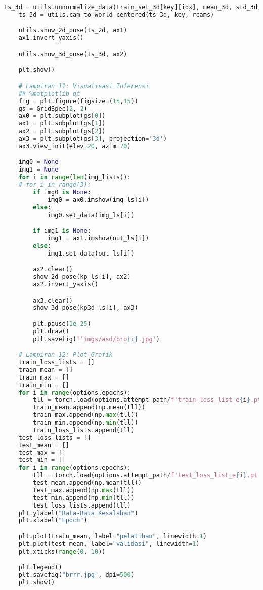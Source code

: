 \begin{lstlisting}[language=Python,multicols=2,basicstyle=\scriptsize\mdseries,breaklines=true]
    ts_3d = utils.unnormalize_data(train_set_3d[key][idx], mean_3d, std_3d, dim_ignore_3d)[0]
    ts_3d = utils.cam_to_world_centered(ts_3d, key, rcams)

    utils.show_2d_pose(ts_2d, ax1)
    ax1.invert_yaxis()

    utils.show_3d_pose(ts_3d, ax2)

    plt.show()

    # Lampiran 11: Visualisasi Inferensi
    ## %matplotlib qt
    fig = plt.figure(figsize=(15,15))
    gs = GridSpec(2, 2)
    ax0 = plt.subplot(gs[0])
    ax1 = plt.subplot(gs[1])
    ax2 = plt.subplot(gs[2])
    ax3 = plt.subplot(gs[3], projection='3d')
    ax3.view_init(elev=20, azim=70)

    img0 = None
    img1 = None
    for i in range(len(img_lists)):
    # for i in range(3):
        if img0 is None:
            img0 = ax0.imshow(img_ls[i])
        else:
            img0.set_data(img_ls[i])

        if img1 is None:
            img1 = ax1.imshow(out_ls[i])
        else:
            img1.set_data(out_ls[i])

        ax2.clear()
        show_2d_pose(kp_ls[i], ax2)
        ax2.invert_yaxis()

        ax3.clear()
        show_3d_pose(kp3d_ls[i], ax3)

        plt.pause(1e-25)
        plt.draw()
        plt.savefig(f'imgs/asd/bro{i}.jpg')

    # Lampiran 12: Plot Grafik
    train_loss_lists = []
    train_mean = []
    train_max = []
    train_min = []
    for i in range(options.epochs):
        tll = torch.load(options.attempt_path/f'train_loss_list_e{i}.pt')
        train_mean.append(np.mean(tll))
        train_max.append(np.max(tll))
        train_min.append(np.min(tll))
        train_loss_lists.append(tll)
    test_loss_lists = []
    test_mean = []
    test_max = []
    test_min = []
    for i in range(options.epochs):
        tll = torch.load(options.attempt_path/f'test_loss_list_e{i}.pt')
        test_mean.append(np.mean(tll))
        test_max.append(np.max(tll))
        test_min.append(np.min(tll))
        test_loss_lists.append(tll)
    plt.ylabel("Rata-Rata Kesalahan")
    plt.xlabel("Epoch")

    plt.plot(train_mean, label="pelatihan", linewidth=1)
    plt.plot(test_mean, label="validasi", linewidth=1)
    plt.xticks(range(0, 10))

    plt.legend()
    plt.savefig("brrr.jpg", dpi=500)
    plt.show()

    \end{lstlisting}


